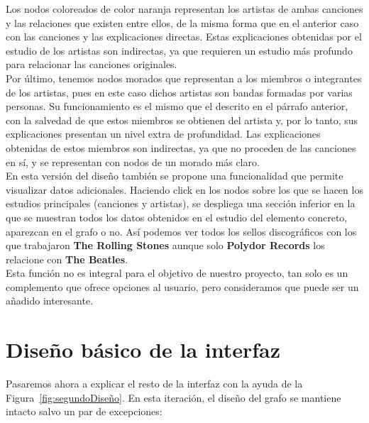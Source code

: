 Los nodos coloreados de color naranja representan los artistas de ambas canciones y las relaciones que existen entre ellos, de la misma forma que en el anterior caso con las canciones y las explicaciones directas. Estas explicaciones obtenidas por el estudio de los artistas son indirectas, ya que requieren un estudio más profundo para relacionar las canciones originales.\\

Por último, tenemos nodos morados que representan a los miembros o integrantes de los artistas, pues en este caso dichos artistas son bandas formadas por varias personas. Su funcionamiento es el mismo que el descrito en el párrafo anterior, con la salvedad de que estos miembros se obtienen del artista y, por lo tanto, sus explicaciones presentan un nivel extra de profundidad. Las explicaciones obtenidas de estos miembros son indirectas, ya que no proceden de las canciones en sí, y se representan con nodos de un morado más claro.\\

En esta versión del diseño también se propone una funcionalidad que permite visualizar datos adicionales. Haciendo click en los nodos sobre los que se hacen los estudios principales (canciones y artistas), se despliega una sección inferior en la que se muestran todos los datos obtenidos en el estudio del elemento concreto, aparezcan en el grafo o no. Así podemos ver todos los sellos discográficos con los que trabajaron \textbf{The Rolling Stones} aunque solo \textbf{Polydor Records} los relacione con \textbf{The Beatles}.\\

Esta función no es integral para el objetivo de nuestro proyecto, tan solo es un complemento que ofrece opciones al usuario, pero consideramos que puede ser un añadido interesante.\\

\section{Diseño básico de la interfaz}

Pasaremos ahora a explicar el resto de la interfaz con la ayuda de la Figura~\ref{fig:segundoDiseño}. En esta iteración, el diseño del grafo se mantiene intacto salvo un par de excepciones:

